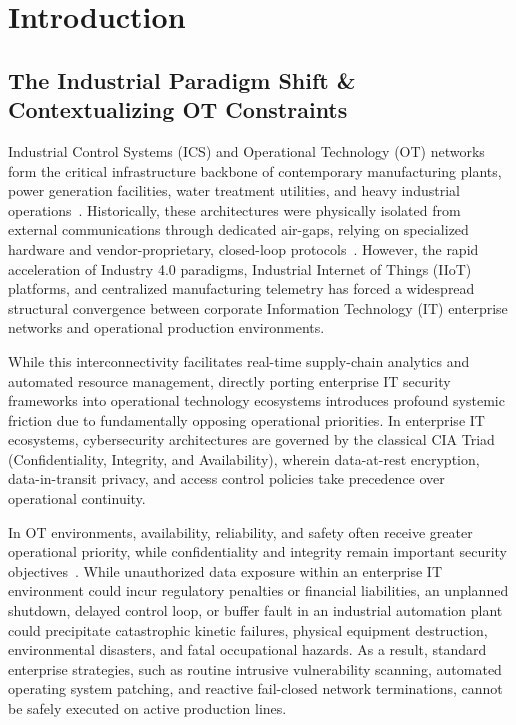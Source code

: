 \documentclass[target=mst,aauheader=aics,style=]{thud}
\begin{document}
\chapter{Introduction}
\label{ch:introduction}

\section{The Industrial Paradigm Shift \& Contextualizing OT Constraints}
Industrial Control Systems (ICS) and Operational Technology (OT) networks form the critical infrastructure backbone of contemporary manufacturing plants, power generation facilities, water treatment utilities, and heavy industrial operations~\cite{SunderOT}. Historically, these architectures were physically isolated from external communications through dedicated air-gaps, relying on specialized hardware and vendor-proprietary, closed-loop protocols~\cite{StanExtended}. However, the rapid acceleration of Industry 4.0 paradigms, Industrial Internet of Things (IIoT) platforms, and centralized manufacturing telemetry has forced a widespread structural convergence between corporate Information Technology (IT) enterprise networks and operational production environments.

While this interconnectivity facilitates real-time supply-chain analytics and automated resource management, directly porting enterprise IT security frameworks into operational technology ecosystems introduces profound systemic friction due to fundamentally opposing operational priorities. In enterprise IT ecosystems, cybersecurity architectures are governed by the classical CIA Triad (Confidentiality, Integrity, and Availability), wherein data-at-rest encryption, data-in-transit privacy, and access control policies take precedence over operational continuity. 

In OT environments, availability, reliability, and safety often receive greater operational priority, while confidentiality and integrity remain important security objectives~\cite{SunderOT}. While unauthorized data exposure within an enterprise IT environment could incur regulatory penalties or financial liabilities, an unplanned shutdown, delayed control loop, or buffer fault in an industrial automation plant could precipitate catastrophic kinetic failures, physical equipment destruction, environmental disasters, and fatal occupational hazards. As a result, standard enterprise strategies, such as routine intrusive vulnerability scanning, automated operating system patching, and reactive fail-closed network terminations, cannot be safely executed on active production lines.
\end{document}
